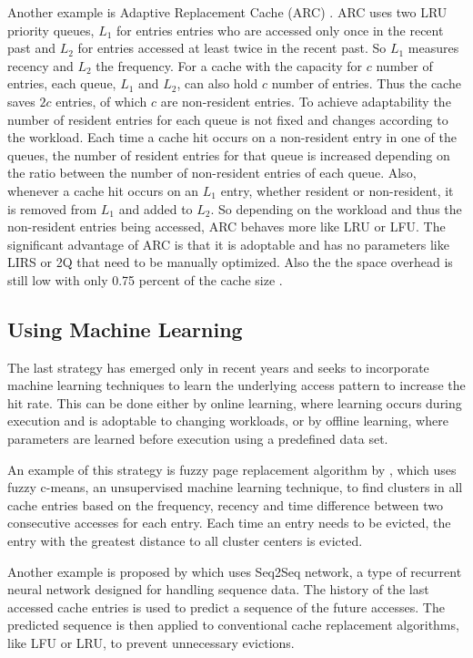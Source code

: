 \documentclass[
	12pt,
	a4paper,
	abstract,
	bibliography=totoc,
	chapterprefix,
	headings=openright,
	numbers=endperiod,
	parskip=half,
	twoside,
]{scrreprt}
\begin{document}
Another example is Adaptive Replacement Cache (ARC) \cite{270366}.
ARC uses two LRU priority queues, $L_1$ for entries entries who are accessed only once in the recent past and 
$L_2$ for entries accessed at least twice in the recent past.
So $L_1$ measures recency and $L_2$ the frequency.
For a cache with the capacity for $c$ number of entries, each queue, $L_1$ and $L_2$, can also hold $c$ number of entries.
Thus the cache saves $2c$ entries, of which $c$ are non-resident entries.
To achieve adaptability the number of resident entries for each queue is not fixed and changes according to the workload.
Each time a cache hit occurs on a non-resident entry in one of the queues, the number of resident entries for that queue is increased
depending on the ratio between the number of non-resident entries of each queue.
Also, whenever a cache hit occurs on an $L_1$ entry, whether resident or non-resident, it is removed from $L_1$ and added to $L_2$.
So depending on the workload and thus the non-resident entries being accessed, ARC behaves more like LRU or LFU.
The significant advantage of ARC is that it is adoptable and has no parameters like LIRS or 2Q that need to be manually optimized.
Also the the space overhead is still low with only 0.75 percent of the cache size \cite{megiddo2004outperforming}.

\subsection{Using Machine Learning}

The last strategy has emerged only in recent years and seeks to incorporate machine learning techniques to learn 
the underlying access pattern to increase the hit rate.
This can be done either by online learning, where learning occurs during execution and is adoptable to changing workloads, 
or by offline learning, where parameters are learned before execution using a predefined data set.

An example of this strategy is fuzzy page replacement algorithm by \cite{akbari2020page}, which uses
fuzzy c-means, an unsupervised machine learning technique, to find clusters in all cache entries based on the frequency, recency and 
time difference between two consecutive accesses for each entry.
Each time an entry needs to be evicted, the entry with the greatest distance to all cluster centers is evicted.

Another example is proposed by \cite{choi2022learning} which uses Seq2Seq network, 
a type of recurrent neural network designed for handling sequence data.
The history of the last accessed cache entries is used to predict a sequence of the future accesses.
The predicted sequence is then applied to conventional cache replacement algorithms, like LFU or LRU, to prevent unnecessary evictions. 
\end{document}
